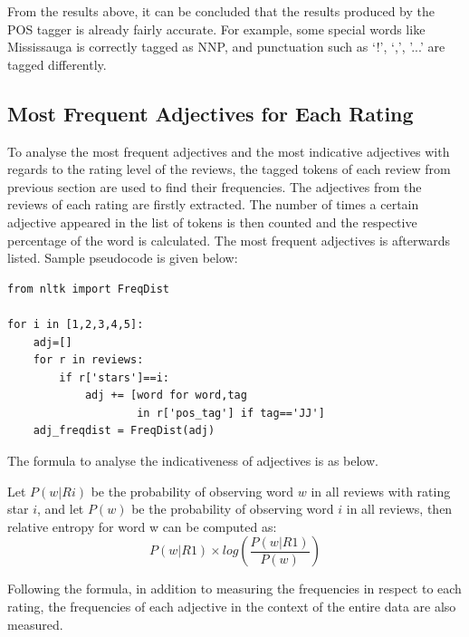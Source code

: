 \documentclass[sigconf]{acmart}
\begin{document}
From the results above, it can be concluded that the results produced by the POS tagger is already fairly accurate. For example, some special words like Mississauga is correctly tagged as NNP, and punctuation such as ‘!', ‘,’, '...' are tagged differently.

\subsection{Most Frequent Adjectives for Each Rating}
To analyse the most frequent adjectives and the most indicative adjectives with regards to the rating level of the reviews, the tagged tokens of each review from previous section are used to find their frequencies. The adjectives from the reviews of each rating are firstly extracted. The number of times a certain adjective appeared in the list of tokens is then counted and the respective percentage of the word is calculated. The most frequent adjectives is afterwards listed. Sample pseudocode is given below:

\begin{verbatim}
from nltk import FreqDist

for i in [1,2,3,4,5]:
    adj=[] 
    for r in reviews:
        if r['stars']==i:
            adj += [word for word,tag 
                    in r['pos_tag'] if tag=='JJ']
    adj_freqdist = FreqDist(adj)
\end{verbatim}

The formula to analyse the indicativeness of adjectives is as below.

Let \begin{math}P(w|Ri)\end{math} be the probability of observing word \begin{math}w\end{math} in all reviews with rating star \begin{math}i\end{math}, and let \begin{math}P(w)\end{math} be the probability of observing word \begin{math}i\end{math} in all reviews, then relative entropy for word w can be computed as: \begin{equation}
    P(w|R1)\times log(\frac{P(w|R1)}{P(w)})
\end{equation}

Following the formula, in addition to measuring the frequencies in respect to each rating, the frequencies of each adjective in the context of the entire data are also measured.
\end{document}

